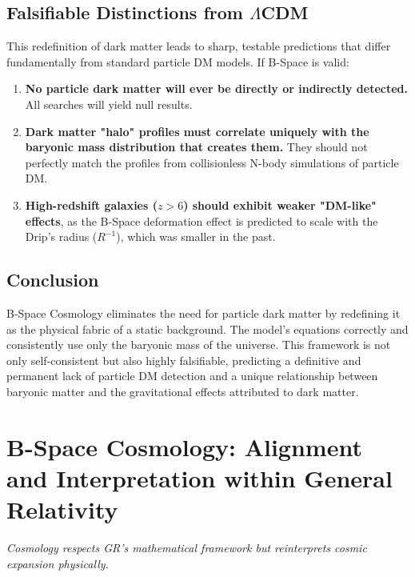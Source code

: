 \documentclass{BSpacePaper} %
\begin{document}
\begin{appendices}
\subsection{Falsifiable Distinctions from \(\Lambda\)CDM}
This redefinition of dark matter leads to sharp, testable predictions that differ fundamentally from standard particle DM models. If B-Space is valid:
\begin{enumerate}
    \item \textbf{No particle dark matter will ever be directly or indirectly detected.} All searches will yield null results.
    \item \textbf{Dark matter "halo" profiles must correlate uniquely with the baryonic mass distribution that creates them.} They should not perfectly match the profiles from collisionless N-body simulations of particle DM.
    \item \textbf{High-redshift galaxies ($z>6$) should exhibit weaker "DM-like" effects}, as the B-Space deformation effect is predicted to scale with the Drip's radius ($R^{-1}$), which was smaller in the past.
\end{enumerate}

\subsection{Conclusion}
B-Space Cosmology eliminates the need for particle dark matter by redefining it as the physical fabric of a static background. The model's equations correctly and consistently use only the baryonic mass of the universe. This framework is not only self-consistent but also highly falsifiable, predicting a definitive and permanent lack of particle DM detection and a unique relationship between baryonic matter and the gravitational effects attributed to dark matter.

\clearpage

\section{B-Space Cosmology: Alignment and Interpretation within General Relativity}
\label{app:gr}
\setcounter{equation}{0}
\setcounter{table}{0}

\begin{center}
    \textit{\bspace{} Cosmology respects GR's mathematical framework but reinterprets cosmic expansion physically.}
\end{center}
\vspace{1em}


\end{appendices}
\end{document}
